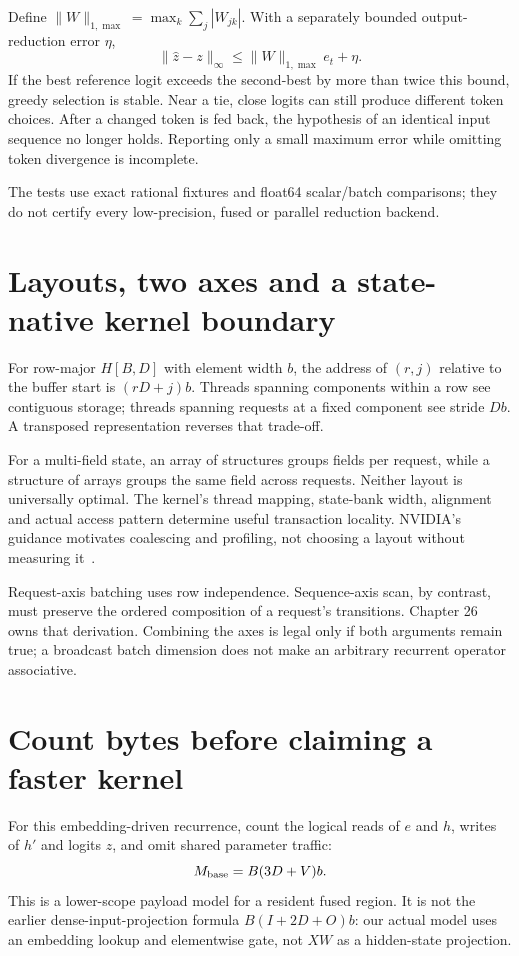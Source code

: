 Define $\|W\|_{1,\max}=\max_k\sum_j|W_{jk}|$. With a separately bounded
output-reduction error $\eta$,
\[
 \|\widehat z-z\|_\infty\le \|W\|_{1,\max}e_t+\eta.
\]
If the best reference logit exceeds the second-best by more than twice this
bound, greedy selection is stable. Near a tie, close logits can still produce
different token choices. After a changed token is fed back, the hypothesis
of an identical input sequence no longer holds. Reporting only a small
maximum error while omitting token divergence is incomplete.

The tests use exact rational fixtures and float64 scalar/batch comparisons;
they do not certify every low-precision, fused or parallel reduction backend.

\section{Layouts, two axes and a state-native kernel boundary}
\label{evod34:layout}
For row-major $H[B,D]$ with element width $b$, the address of $(r,j)$ relative
to the buffer start is $(rD+j)b$. Threads spanning components within a row
see contiguous storage; threads spanning requests at a fixed component see
stride $Db$. A transposed representation reverses that trade-off.


For a multi-field state, an array of structures groups fields per request,
while a structure of arrays groups the same field across requests. Neither
layout is universally optimal. The kernel's thread mapping, state-bank width,
alignment and actual access pattern determine useful transaction locality.
NVIDIA's guidance motivates coalescing and profiling, not choosing a layout
without measuring it~\cite{cuda}.

Request-axis batching uses row independence. Sequence-axis scan, by contrast,
must preserve the ordered composition of a request's transitions. Chapter 26
owns that derivation. Combining the axes is legal only if both arguments
remain true; a broadcast batch dimension does not make an arbitrary recurrent
operator associative.

\section{Count bytes before claiming a faster kernel}
\label{evod34:traffic}
For this embedding-driven recurrence, count the logical reads of $e$ and $h$,
writes of $h'$ and logits $z$, and omit shared parameter traffic:
\[
 M_{\rm base}=B(3D+V)b.
\]
This is a lower-scope payload model for a resident fused region. It is not the
earlier dense-input-projection formula $B(I+2D+O)b$: our actual model uses an
embedding lookup and elementwise gate, not $XW$ as a hidden-state projection.

